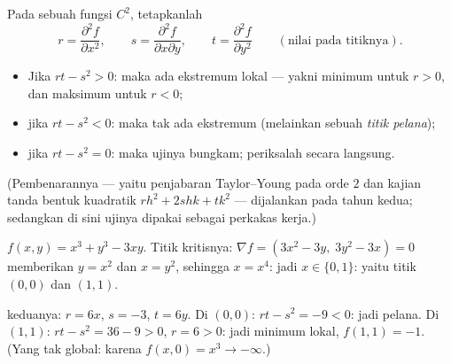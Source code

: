 \begin{method}\label{met:b1:multivar:monge}
Pada sebuah  fungsi $C^2$, tetapkanlah
\[
r = \frac{\partial^2 f}{\partial x^2},
\qquad
s = \frac{\partial^2 f}{\partial x \partial y},
\qquad
t = \frac{\partial^2 f}{\partial y^2}
\qquad (\text{nilai pada titiknya}).
\]
\begin{itemize}
  \item Jika $rt - s^2 > 0$: maka ada ekstremum lokal --- yakni minimum untuk $r > 0$,
        dan maksimum untuk $r < 0$;
  \item jika $rt - s^2 < 0$: maka tak ada ekstremum (melainkan sebuah \emph{titik
        pelana});
  \item jika $rt - s^2 = 0$: maka ujinya bungkam; periksalah secara langsung.
\end{itemize}
(Pembenarannya --- yaitu penjabaran Taylor--Young pada orde $2$ dan
kajian tanda bentuk kuadratik $r h^2 + 2shk + tk^2$ ---
dijalankan pada tahun kedua; sedangkan di sini ujinya dipakai sebagai perkakas
kerja.)
\end{method}

\begin{example}\label{ex:b1:multivar:extrema}
$f(x,y) = x^3 + y^3 - 3xy$. Titik kritisnya: $\nabla f = (3x^2 -
3y,\; 3y^2 - 3x) = 0$ memberikan $y = x^2$ dan $x = y^2$, sehingga $x = x^4$:
jadi $x \in \{0, 1\}$: yaitu titik $(0,0)$ dan $(1,1)$.

 keduanya: $r = 6x$, $s = -3$, $t = 6y$. Di $(0,0)$: $rt -
s^2 = -9 < 0$: jadi pelana. Di $(1,1)$: $rt - s^2 = 36 - 9 > 0$, $r = 6
> 0$: jadi minimum lokal, $f(1,1) = -1$. (Yang tak global: karena $f(x, 0) = x^3 \to
-\infty$.)
\end{example}

